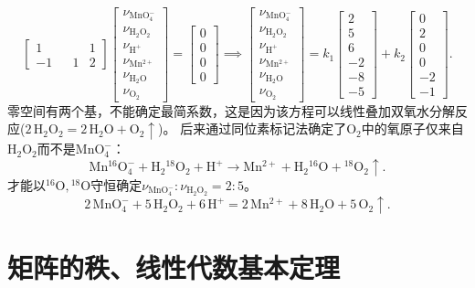\begin{example}
\[\begin{bmatrix}
			1&&&1\\
			-1&&1&2
		\end{bmatrix}
		\begin{bmatrix}
			\nu_\mathrm{MnO_4^-}\\\nu_\mathrm{H_2O_2}\\\nu_\mathrm{H^+}\\\nu_\mathrm{Mn^{2+}}\\\nu_\mathrm{H_2O}\\\nu_\mathrm{O_2}
		\end{bmatrix}=\begin{bmatrix}
			0\\0\\0\\0
		\end{bmatrix}
		\implies
		\begin{bmatrix}
			\nu_\mathrm{MnO_4^-}\\\nu_\mathrm{H_2O_2}\\\nu_\mathrm{H^+}\\\nu_\mathrm{Mn^{2+}}\\\nu_\mathrm{H_2O}\\\nu_\mathrm{O_2}
		\end{bmatrix}=k_1\begin{bmatrix}
			2\\5\\6\\-2\\-8\\-5
		\end{bmatrix}+k_2\begin{bmatrix}
			0\\2\\0\\0\\-2\\-1
		\end{bmatrix}.
	\]
	零空间有两个基，不能确定最简系数，这是因为该方程可以线性叠加双氧水分解反应($\mathrm{2\,H_2O_2=2\,H_2O+O_2\uparrow}$)。
	后来通过同位素标记法确定了$\mathrm{O_2}$中的氧原子仅来自$\mathrm{H_2O_2}$而不是$\mathrm{MnO_4^-}$：
	\[
		\mathrm{Mn{}^{16}O_4^-+H_2{}^{18}O_2+H^+\to Mn^{2+}+H_2{}^{16}O+{}^{18}O_2\uparrow}.
	\]	
	才能以$\mathrm{{}^{16}O,{}^{18}O}$守恒确定$\nu_\mathrm{MnO_4^-}:\nu_\mathrm{H_2O_2}=2:5$。
	\[
		\mathrm{2\,MnO_4^-+5\,H_2O_2+6\,H^+=2\,Mn^{2+}+8\,H_2O+5\,O_2\uparrow}.
	\]
\end{example}

\clearpage
\section{矩阵的秩、线性代数基本定理}

